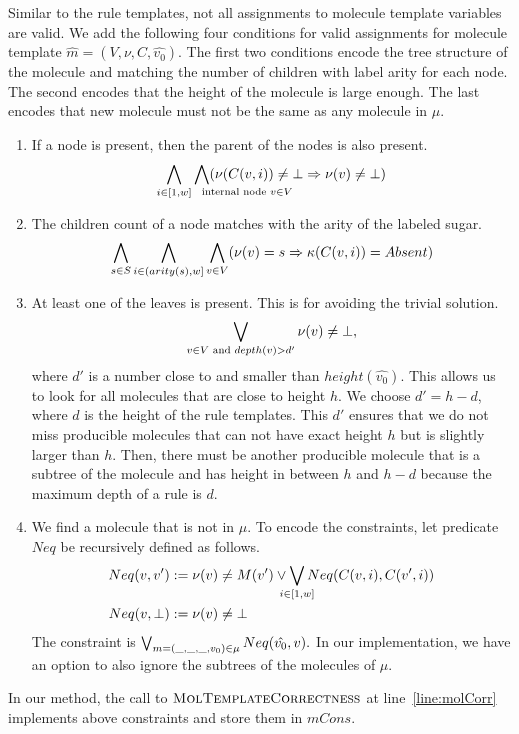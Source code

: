 %
Similar to the rule templates, not all assignments to molecule template variables
are valid.
We add the following four conditions for
valid assignments for molecule template $\hat{m} = (V, \nu, C, \hat{v_0})$.
The first  two conditions encode the tree structure of the molecule and
matching the number of children with label arity for each node.
The second encodes that the height of the molecule is large enough.
The last encodes that new molecule must not be the same as any molecule in $\mu$.
\begin{enumerate}
\item If a node is present, then the parent of the nodes is also present.
  $$
  \Land_{i\in[1,w]}\Land_{\mathrlap{\text{internal node } v \in V}} (\nu(C(v,i) ) \neq \bot \limplies \nu( v ) \neq \bot )  
  $$
\item The children count of a node matches with the arity of the labeled sugar.
  $$
  \bigwedge_{s \in S} \bigwedge_{i \in (arity(s),w] }\bigwedge_{v \in V} (\nu(v) = s \Rightarrow \kappa( C(v,i) ) = Absent )
  $$
\item At least one of the leaves is present. This is for
  avoiding the trivial solution.
  $$
  \bigvee_{ v \in V \text{ and } depth(v) > d' } \nu( v ) \neq \bot,
  $$
  where $d'$ is a number close to and smaller than $height(\hat{v_0})$.
  This allows us to look for all molecules that are close
  to height $h$.
  We choose $d' = h-d$, where $d$ is the height of the rule templates.
  This $d'$ ensures that we do not miss producible molecules that
  can not have exact height $h$ but is slightly larger than $h$.
  Then, there must be another producible
  molecule that is a subtree of the molecule and has height in
  between $h$ and $h-d$
  because the maximum depth of a rule is $d$.
\item We find a molecule that is not in $\mu$.
  To encode the constraints, let predicate $Neq$ be recursively defined as follows.
  \begin{align*}
  Neq(v, v') :=\;&   \nu(v) \neq M(v') \lor
  \Lor_{\mathclap{i \in [1,w]}} Neq( C(v,i), C(v',i ) )\\
    Neq(v,\bot) :=\;&  \nu(v) \neq \bot
  \end{align*}
  The constraint is
  $\Lor_{%
    {m = (\_,\_,\_, v_0)\in \mu}}  Neq(\hat{v_0},v).$
  In our implementation, 
  we have an option to also ignore the subtrees of
  the molecules of $\mu$.
\end{enumerate}
%
In our method, the call to $\textsc{MolTemplateCorrectness}$ at
line~\ref{line:molCorr} implements above constraints and store them in
$mCons$. 

